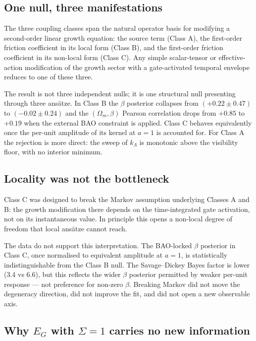 \documentclass[11pt,a4paper]{article}
\begin{document}
\subsection{One null, three manifestations}

The three coupling classes span the natural operator basis for modifying a second-order linear growth equation: the source term (Class A), the first-order friction coefficient in its local form (Class B), and the first-order friction coefficient in its non-local form (Class C). Any simple scalar-tensor or effective-action modification of the growth sector with a gate-activated temporal envelope reduces to one of these three.

The result is not three independent nulls; it is one structural null presenting through three ansätze. In Class B the $\beta$ posterior collapses from $(+0.22 \pm 0.47)$ to $(-0.02 \pm 0.24)$ and the $(\Omega_m, \beta)$ Pearson correlation drops from $+0.85$ to $+0.19$ when the external BAO constraint is applied. Class C behaves equivalently once the per-unit amplitude of its kernel at $a = 1$ is accounted for. For Class A the rejection is more direct: the sweep of $k_\Lambda$ is monotonic above the visibility floor, with no interior minimum.

\subsection{Locality was not the bottleneck}

Class C was designed to break the Markov assumption underlying Classes A and B: the growth modification there depends on the time-integrated gate activation, not on its instantaneous value. In principle this opens a non-local degree of freedom that local ansätze cannot reach.

The data do not support this interpretation. The BAO-locked $\beta$ posterior in Class C, once normalised to equivalent amplitude at $a = 1$, is statistically indistinguishable from the Class B null. The Savage--Dickey Bayes factor is lower (3.4 vs 6.6), but this reflects the wider $\beta$ posterior permitted by weaker per-unit response --- not preference for non-zero $\beta$. Breaking Markov did not move the degeneracy direction, did not improve the fit, and did not open a new observable axis.

\subsection{Why $E_G$ with $\Sigma = 1$ carries no new information}
\end{document}
